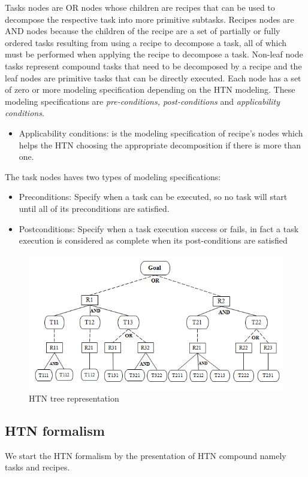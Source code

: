 Tasks nodes are OR nodes whose children are recipes that can be used to decompose the respective task into more primitive subtasks. Recipes nodes are AND nodes because the children of the recipe are a set of partially or fully ordered tasks resulting from using a recipe to decompose a task, all of which must be performed when applying the recipe to decompose a task.
Non-leaf node tasks represent compound tasks that need to be decomposed by a recipe and the leaf nodes are primitive tasks that can be directly executed. 
Each node has a set of zero or more modeling specification depending on the HTN modeling. These modeling specifications are \textit{pre-conditions, post-conditions} and \textit{applicability conditions}. 
\begin{itemize}
	\item	Applicability conditions: is the modeling specification of recipe’s nodes which helps the HTN choosing the appropriate decomposition if there is more than one.
\end{itemize}
	The task nodes haves two types of modeling specifications:  
\begin{itemize}
	\item	Preconditions: Specify when a task can be executed, so no task will start until all of its preconditions are satisfied.
	\item Postconditions: Specify when a task execution success or fails, in fact a task execution is considered as complete when its post-conditions are satisfied
	
\end{itemize}
\begin{figure}[h]
	\centering
	\includegraphics[width=.75\columnwidth]{Pictures/HTN.png}
	\caption{\label{HTN tree representation} HTN tree representation}
\end{figure}

\subsection{HTN formalism}
We start the HTN formalism by the presentation of HTN compound namely tasks and recipes. 

